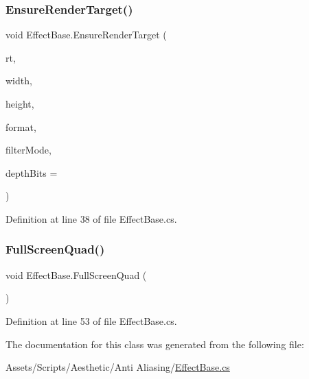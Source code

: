 \subsubsection{\texorpdfstring{Ensure\+Render\+Target()}{EnsureRenderTarget()}}
{\footnotesize\ttfamily void Effect\+Base.\+Ensure\+Render\+Target (\begin{DoxyParamCaption}\item[{ref Render\+Texture}]{rt,  }\item[{int}]{width,  }\item[{int}]{height,  }\item[{Render\+Texture\+Format}]{format,  }\item[{Filter\+Mode}]{filter\+Mode,  }\item[{int}]{depth\+Bits = {} }\end{DoxyParamCaption})}



Definition at line 38 of file Effect\+Base.\+cs.

\mbox{\label{class_effect_base_a9a8d533c537feeaa9349f09665dc6cd8}} 
\subsubsection{\texorpdfstring{Full\+Screen\+Quad()}{FullScreenQuad()}}
{\footnotesize\ttfamily void Effect\+Base.\+Full\+Screen\+Quad (\begin{DoxyParamCaption}{ }\end{DoxyParamCaption})}



Definition at line 53 of file Effect\+Base.\+cs.



The documentation for this class was generated from the following file\+:\begin{DoxyCompactItemize}
\item 
Assets/\+Scripts/\+Aesthetic/\+Anti Aliasing/\mbox{\hyperlink{_effect_base_8cs}{Effect\+Base.\+cs}}\end{DoxyCompactItemize}
